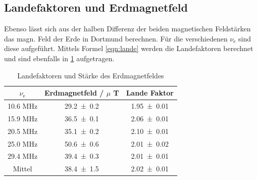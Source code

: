 \subsection{Landefaktoren und Erdmagnetfeld}
Ebenso lässt sich aus der halben Differenz der beiden magnetischen Feldstärken das magn. Feld der Erde in Dortmund berechnen. Für die verschiedenen $\nu_\text{e}$ sind diese aufgeführt.
Mittels Formel \ref{eqn:lande} werden die Landefaktoren berechnet und sind ebenfalls in \ref{tab:lande} aufgetragen.
\begin{table}
  \centering
  \caption{Landefaktoren und Stärke des Erdmagnetfeldes}
  \begin{tabular}{c|c c}
    \toprule
    	$\nu_\text{e}$ & Erdmagnetfeld / $\mu$ T & Lande Faktor \\
    \midrule
       	10.6 MHz & \num{29.2 +- 0.2} & \num{1.95 +- 0.01} \\
	15.9 MHz & \num{36.5 +- 0.1} & \num{2.06 +- 0.01} \\ 
	20.5 MHz & \num{35.1 +- 0.2} & \num{2.10 +- 0.01} \\
	25.0 MHz & \num{50.6 +- 0.6} & \num{2.01 +- 0.02} \\
	29.4 MHz & \num{39.4 +- 0.3} & \num{2.01 +- 0.01} \\
    \midrule
	Mittel & \num{38.4 +- 1.5} & \num{2.02 +- 0.01} \\
    \bottomrule
  \end{tabular}
  \label{tab:lande}
\end{table}

